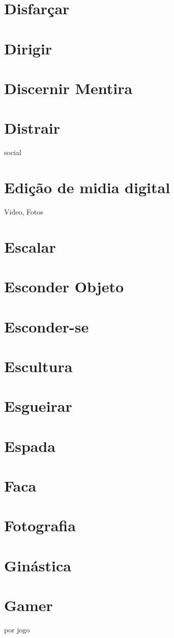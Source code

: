 \section{Disfarçar}
\section{Dirigir}
\section{Discernir Mentira}
\section{Distrair} social
\section{Edição de midia digital} Video, Fotos
\section{Escalar}
\section{Esconder Objeto}
\section{Esconder-se}
\section{Escultura}
\section{Esgueirar}
\section{Espada}
\section{Faca}
\section{Fotografia}
\section{Ginástica}%
\section{Gamer} por jogo
